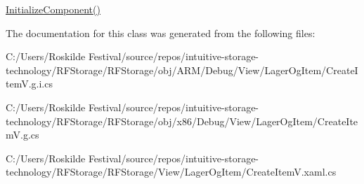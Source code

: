 \mbox{\hyperlink{class_r_f_storage_1_1_view_1_1_lager_og_item_1_1_create_item_v_ab6c7e50ca58f3a267d0015a59848b72d}{Initialize\+Component()}} 



The documentation for this class was generated from the following files\+:\begin{DoxyCompactItemize}
\item 
C\+:/\+Users/\+Roskilde Festival/source/repos/intuitive-\/storage-\/technology/\+R\+F\+Storage/\+R\+F\+Storage/obj/\+A\+R\+M/\+Debug/\+View/\+Lager\+Og\+Item/Create\+Item\+V.\+g.\+i.\+cs\item 
C\+:/\+Users/\+Roskilde Festival/source/repos/intuitive-\/storage-\/technology/\+R\+F\+Storage/\+R\+F\+Storage/obj/x86/\+Debug/\+View/\+Lager\+Og\+Item/Create\+Item\+V.\+g.\+cs\item 
C\+:/\+Users/\+Roskilde Festival/source/repos/intuitive-\/storage-\/technology/\+R\+F\+Storage/\+R\+F\+Storage/\+View/\+Lager\+Og\+Item/Create\+Item\+V.\+xaml.\+cs\end{DoxyCompactItemize}
